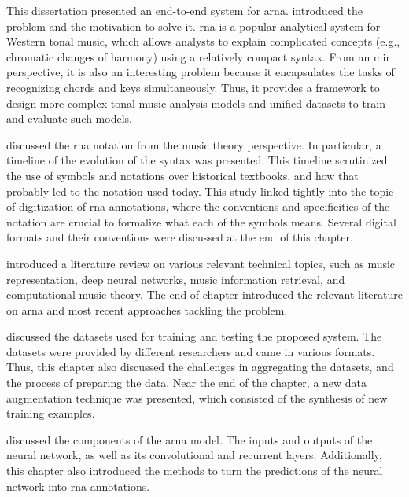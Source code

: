 
This dissertation presented an end-to-end system for
\gls{arna}.  introduced the problem
and the motivation to solve it. \gls{rna} is a popular
analytical system for Western tonal music, which allows
analysts to explain complicated concepts (e.g., chromatic
changes of harmony) using a relatively compact syntax. From
an \gls{mir} perspective, it is also an interesting problem
because it encapsulates the tasks of recognizing chords and
keys simultaneously. Thus, it provides a framework to design
more complex tonal music analysis models and unified
datasets to train and evaluate such models.

 discussed the
\gls{rna} notation from the music theory perspective. In
particular, a timeline of the evolution of the syntax was
presented. This timeline scrutinized the use of symbols and
notations over historical textbooks, and how that probably
led to the notation used today. This study linked tightly
into the topic of digitization of \gls{rna} annotations,
where the conventions and specificities of the notation are
crucial to formalize what each of the symbols means. Several
digital formats and their conventions were discussed at the
end of this chapter.

 introduced a literature review on
various relevant technical topics, such as music
representation, deep neural networks, music information
retrieval, and computational music theory. The end of
chapter introduced the relevant literature on \gls{arna} and
most recent approaches tackling the problem.

 discussed the
datasets used for training and testing the proposed system.
The datasets were provided by different researchers and came
in various formats. Thus, this chapter also discussed the
challenges in aggregating the datasets, and the process of
preparing the data. Near the end of the chapter, a new data
augmentation technique was presented, which consisted of the
synthesis of new training examples.

 discussed the components of the
\gls{arna} model. The inputs and outputs of the neural
network, as well as its convolutional and recurrent layers.
Additionally, this chapter also introduced the methods to
turn the predictions of the neural network into \gls{rna}
annotations.

